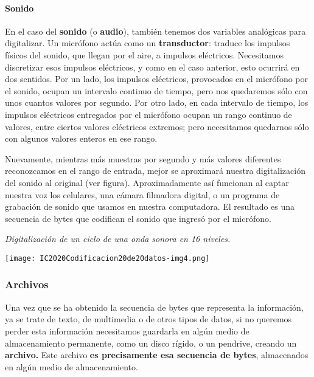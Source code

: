 \documentclass[a4paper]{article}
\begin{document}
\paragraph{Sonido}
En el caso del \textbf{sonido} (o \textbf{audio}), tambi\'en tenemos dos
variables anal\'ogicas para digitalizar. Un micr\'ofono act\'ua como un
\textbf{transductor}: traduce los impulsos f\'isicos del sonido, que
llegan por el aire, a impulsos el\'ectricos. Necesitamos discretizar
esos impulsos el\'ectricos, y como en el caso anterior, esto ocurrir\'a
en dos sentidos. Por un lado, los impulsos el\'ectricos, provocados en
el micr\'ofono por el sonido, ocupan un intervalo continuo de tiempo,
pero nos quedaremos s\'olo con unos cuantos valores por segundo. Por
otro lado, en cada intervalo de tiempo, los impulsos el\'ectricos
entregados por el micr\'ofono ocupan un rango continuo de valores,
entre ciertos valores el\'ectricos extremos; pero necesitamos quedarnos
s\'olo con algunos valores enteros en ese rango. 

Nuevamente, mientras m\'as muestras por segundo y m\'as valores
diferentes reconozcamos en el rango de entrada, mejor se aproximar\'a
nuestra digitalizaci\'on del sonido al original (ver figura).
Aproximadamente as\'i funcionan al captar nuestra voz los celulares,
una c\'amara filmadora digital, o un programa de grabaci\'on de sonido
que usamos en nuestra computadora. El resultado es una secuencia de
bytes que codifican el sonido que ingres\'o por el micr\'ofono.


\bigskip



\begin{center}
\begin{minipage}{17cm}

\bigskip


\bigskip


\bigskip

{\raggedleft\itshape
Digitalizaci\'on de un ciclo de una \newline
onda sonora en 16 niveles.
\par}


\texttt{[image: IC2020Codificacion20de20datos-img4.png]}

\end{minipage}
\end{center}

\bigskip

\subsubsection{Archivos}
Una vez que se ha obtenido la secuencia de bytes que representa la
informaci\'on, ya se trate de texto, de multimedia o de otros tipos de
datos, si no queremos perder esta informaci\'on necesitamos guardarla
en alg\'un medio de almacenamiento permanente, como un disco r\'igido,
o un pendrive, creando un \textbf{archivo.} Este archivo \textbf{es
precisamente esa secuencia de bytes}, almacenados en alg\'un medio de
almacenamiento.
\end{document}
